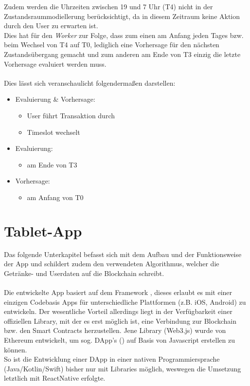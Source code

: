 Zudem werden die Uhrzeiten zwischen 19 und 7 Uhr (T4) nicht in der Zustandsraummodiellerung berücksichtigt, da in diesem Zeitraum keine Aktion durch den User zu erwarten ist.\\ 
Dies hat für den \textit{Worker} zur Folge, dass zum einen am Anfang jeden Tages bzw. beim Wechsel von T4 auf T0, lediglich eine Vorhersage für den nächsten Zustandsübergang gemacht und zum anderen am Ende von T3 einzig die letzte Vorhersage evaluiert werden muss.\\\\
Dies lässt sich veranschaulicht folgendermaßen darstellen:
\begin{itemize}
	\item Evaluierung \& Vorhersage: 
	      \begin{itemize}
	      	\item User führt Transaktion durch
	      	\item Timeslot wechselt
	      \end{itemize}
	\item Evaluierung:
	      \begin{itemize}
	      	\item am Ende von T3
	      \end{itemize}
	\item Vorhersage:
	      \begin{itemize}
	      	\item am Anfang von T0
	      \end{itemize}
\end{itemize}    

\newpage
\section{Tablet-App}
\label{sec:app}

Das folgende Unterkapitel befasst sich mit dem Aufbau und der Funktionsweise der App und schildert zudem den verwendeten Algorithmus, welcher die Getränke- und Userdaten auf die Blockchain schreibt.\\\\
Die entwickelte App basiert auf dem Framework  \cite{RN:ReactNative}, dieses erlaubt es mit einer einzigen Codebasis Apps für unterschiedliche Plattformen (z.B. iOS, Android) zu entwickeln. Der wesentliche Vorteil allerdings liegt in der Verfügbarkeit einer offiziellen Library, mit der es erst möglich ist, eine Verbindung zur Blockchain bzw. den Smart Contracts herzustellen. Jene Library (Web3.js) wurde von Ethereum entwickelt, um sog. DApp's () \cite{DApp} auf Basis von Javascript erstellen zu können. \\
So ist die Entwicklung einer DApp in einer nativen Programmiersprache (Java/Kotlin/Swift) bisher nur mit  Libraries möglich, weswegen die Umsetzung letztlich mit ReactNative erfolgte.

